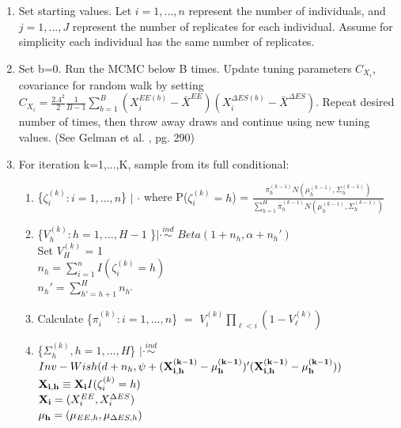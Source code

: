 \documentclass[11pt]{article}\usepackage[]{graphicx}\usepackage[]{color}
\begin{document}
\begin{enumerate}
\item
Set starting values. Let $i=1,...,n$ represent the number of individuals, and $j=1,...,J$ represent the number of replicates for each individual. Assume for simplicity each individual has the same number of replicates.

\item
Set b=0. Run the MCMC below B times. Update tuning parameters $C_{X_i}$, covariance for random walk by setting $C_{X_i} = \frac{2.4^2}{2} \frac{1}{B-1} \sum_{b=1}^{B} (X_i^{EE(b)}-\bar{X}^{EE})(X_i^{\Delta ES(b)}-\bar{X}^{\Delta ES})$. Repeat desired number of times, then throw away draws and continue using new tuning values. (See Gelman et al. \cite{bda}, pg. 290)

\item
For iteration k=1,...,K, sample from its full conditional:

\begin{enumerate}
\item
  \{$\zeta_i^{(k)}:i=1,...,n$\} $|$ $\cdot$  
 where P($\zeta_i^{(k)}=h$) = $\frac{\pi_h^{(k-1)} N(\mu_h^{(k-1)},\Sigma_h^{(k-1)})}{\sum_{h=1}^{H}\pi_h^{(k-1)} N(\mu_h^{(k-1)},\Sigma_h^{(k-1)})}$ \\

\item
 \{$V_h^{(k)}:h=1,...,H-1$ \}$|\cdot \overset{ind}{\sim}$  $Beta(1+n_h,\alpha+n_h')$ \\
Set $V_H^{(k)}$ = 1 \\
$n_h = \sum_{i=1}^{n} I(\zeta_i^{(k)}=h)$\\
$n_h' = \sum_{h'=h+1}^{H} n_{h'}$\\


\item
Calculate \{$\pi_i^{(k)}:i=1,...,n$\} $=$ $V_i^{(k)} \prod_{\ell < i} (1-V_{\ell}^{(k)})$




\item
 \{$\Sigma_{h}^{(k)}, h=1,...,H$\} $|\cdot \overset{ind}{\sim}$ $Inv-Wish(d+n_h,\psi+({\bf X_{i,h}^{(k-1)} - \mu_h^{(k-1)}})'({\bf X_{i,h}^{(k-1)} - \mu_h^{(k-1)}}))$ \\

${\bf X_{i,h}} \equiv  {\bf X_i} I(\zeta_i^{(k)}=h)$ \\
${\bf X_i} = (X_i^{EE},X_i^{\Delta ES})$ \\
${\bf \mu_h} = (\mu_{EE,h},\mu_{\Delta ES,h})$




\end{enumerate}
\end{enumerate}
\end{document}
